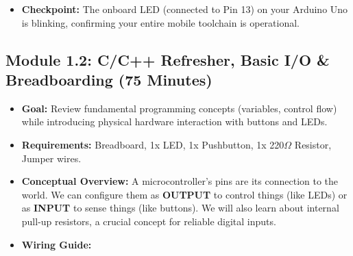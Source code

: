 \documentclass[11pt,a4paper]{article}
\begin{document}
\begin{itemize}
\begin{enumerate}[label=\arabic*.]
\begin{itemize}
        \end{itemize}
        \item \textbf{Flashing the Firmware:}
        \begin{itemize}
            \item The compiled file is located at \verb|.pio/build/uno/firmware.hex|.
            \item From within your Debian environment, copy this file to your phone's shared storage: \verb|cp .pio/build/uno/firmware.hex /data/data/com.termux/files/home/storage/shared/|.
            \item Open ArduinoDroid. Connect your Arduino via the OTG cable. In ArduinoDroid, go to `Sketch` > `Upload`, and navigate to the `.hex` file you just copied. Select it, and ArduinoDroid will handle the upload process.
        \end{itemize}
    \end{enumerate}
    \item \textbf{Checkpoint:} The onboard LED (connected to Pin 13) on your Arduino Uno is blinking, confirming your entire mobile toolchain is operational.
\end{itemize}
\newpage
\subsection*{Module 1.2: C/C++ Refresher, Basic I/O \& Breadboarding (75 Minutes)}

\begin{itemize}
    \item \textbf{Goal:} Review fundamental programming concepts (variables, control flow) while introducing physical hardware interaction with buttons and LEDs.
    \item \textbf{Requirements:} Breadboard, 1x LED, 1x Pushbutton, 1x 220$\Omega$ Resistor, Jumper wires.
    \item \textbf{Conceptual Overview:} A microcontroller's pins are its connection to the world. We can configure them as \textbf{OUTPUT} to control things (like LEDs) or as \textbf{INPUT} to sense things (like buttons). We will also learn about internal pull-up resistors, a crucial concept for reliable digital inputs.
    \item \textbf{Wiring Guide:}
\end{itemize}
\end{document}
